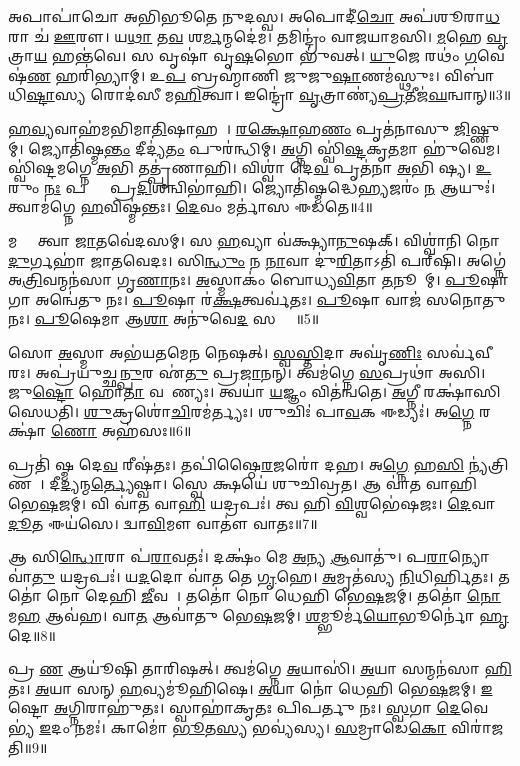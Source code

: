 𑌅𑌪𑌾𑌪𑌾॑𑌚𑍋 𑌅𑌭𑌿𑌭𑍂𑌤𑍇 𑌨𑍁𑌦𑌸𑍍𑌵।
𑌅𑌪𑍋𑌦𑍀॑\ul{𑌚𑍋} 𑌅𑌪॑𑌶𑍂𑌰𑌾\ul{𑌧}𑌰𑌾 𑌚॑ \ul{𑌊}𑌰𑍗।
𑌯\ul{𑌥𑌾} 𑌤\ul{𑌵} 𑌶\ul{𑌰𑍍𑌮}𑌨𑍍𑌮𑌦𑍇॑𑌮।
𑌤𑌮𑌿𑌨𑍍𑌦𑍍𑌰𑌂॑ 𑌵𑌾𑌜𑌯𑌾𑌮𑌸𑌿।
\ul{𑌮}𑌹𑍇 \ul{𑌵𑍃}𑌤𑍍𑌰𑌾\ul{𑌯} 𑌹𑌨𑍍𑌤॑𑌵𑍇।
𑌸 𑌵𑍃𑌷𑌾॑ 𑌵𑍃\ul{𑌷}𑌭𑍋 𑌭𑍁॑𑌵𑌤𑍍।
\ul{𑌯𑍁}𑌜𑍇 𑌰𑌥𑌂॑ \ul{𑌗}𑌵𑍇𑌷॑\ul{𑌣}\ul{} 𑌹𑌰𑌿॑𑌭𑍍𑌯𑌾𑌮𑍍।
𑌉\ul{𑌪} 𑌬𑍍𑌰𑌹𑍍𑌮𑌾॑𑌣𑌿 𑌜𑍁𑌜𑍁\ul{𑌷𑌾}𑌣𑌮॑𑌸𑍍𑌥𑍁𑌃।
𑌵𑌿𑌬𑌾॑𑌧𑌿\ul{𑌷𑍍𑌟𑌾}𑌸𑍍𑌯 𑌰𑍋𑌦॑𑌸𑍀 𑌮\ul{𑌹𑌿}𑌤𑍍𑌵𑌾।
𑌇𑌨𑍍𑌦𑍍𑌰𑍋॑ \ul{𑌵𑍃}𑌤𑍍𑌰𑌾𑌣𑍍𑌯॑\ul{𑌪𑍍𑌰}𑌤𑍀𑌜॑\ul{𑌘}𑌨𑍍𑌵𑌾𑌨𑍍॥3॥

\ul{𑌹}\ul{𑌵𑍍𑌯}𑌵𑌾𑌹॑𑌮𑌭𑌿𑌮𑌾\ul{𑌤𑌿}𑌷𑌾𑌹𑌮𑍍᳚।
\ul{𑌰}\ul{𑌕𑍍𑌷𑍋}𑌹\ul{𑌣𑌂} 𑌪𑍃𑌤॑𑌨𑌾𑌸𑍁 \ul{𑌜𑌿}𑌷𑍍𑌣𑍁𑌮𑍍।
𑌜𑍍𑌯𑍋𑌤𑌿॑𑌷𑍍𑌮\ul{𑌨𑍍𑌤𑌂} 𑌦𑍀𑌦𑍍𑌯॑\ul{𑌤𑌂} 𑌪𑍁𑌰॑𑌨𑍍𑌧𑌿𑌮𑍍।
\ul{𑌅}𑌗𑍍𑌨𑌿 𑌸𑍍𑌵𑌿॑\ul{𑌷𑍍𑌟}𑌕𑍃\ul{𑌤}𑌮𑌾 𑌹𑍁॑𑌵𑍇𑌮।
𑌸𑍍𑌵𑌿॑𑌷𑍍𑌟𑌮𑌗𑍍𑌨𑍇 \ul{𑌅}𑌭𑌿 𑌤𑌤𑍍𑌪𑍃॑𑌣𑌾𑌹𑌿।
𑌵𑌿𑌶𑍍𑌵𑌾॑ 𑌦𑍇\ul{𑌵} 𑌪𑍃𑌤॑𑌨𑌾 \ul{𑌅}𑌭𑌿 𑌷𑍍𑌯।
\ul{𑌉}𑌰𑍁𑌂 \ul{𑌨𑌃} 𑌪𑌨𑍍𑌥𑌾𑌂᳚ 𑌪𑍍𑌰\ul{𑌦𑌿}𑌶𑌨𑍍𑌵𑌿𑌭𑌾॑𑌹𑌿।
𑌜𑍍𑌯𑍋𑌤𑌿॑𑌷𑍍𑌮𑌦𑍍𑌧𑍇\ul{𑌹𑍍𑌯}𑌜𑌰𑌂॑ \ul{𑌨} 𑌆𑌯𑍁𑌃॑।
𑌤𑍍𑌵𑌾𑌮॑𑌗𑍍𑌨𑍇 \ul{𑌹}𑌵𑌿𑌷𑍍𑌮॑𑌨𑍍𑌤𑌃।
\ul{𑌦𑍇}𑌵𑌂 𑌮𑌰𑍍𑌤𑌾॑𑌸 𑌈𑌡𑌤𑍇॥4॥

𑌮𑌨𑍍𑌯𑍇᳚ 𑌤𑍍𑌵𑌾 \ul{𑌜𑌾}𑌤𑌵𑍇॑𑌦𑌸𑌮𑍍।
𑌸 \ul{𑌹}𑌵𑍍𑌯𑌾 𑌵॑𑌕𑍍𑌷𑍍𑌯𑌾\ul{𑌨𑍁}𑌷𑌕𑍍।
𑌵𑌿𑌶𑍍𑌵𑌾॑𑌨𑌿 𑌨𑍋 \ul{𑌦𑍁}𑌰𑍍𑌗𑌹𑌾॑ 𑌜𑌾𑌤𑌵𑍇𑌦𑌃।
𑌸𑌿\ul{𑌨𑍍𑌧𑍁𑌂} 𑌨 \ul{𑌨𑌾}𑌵𑌾 𑌦𑍁॑\ul{𑌰𑌿}𑌤𑌾𑌽𑌤𑌿॑ 𑌪𑌰𑍍‌\mbox{}𑌷𑌿।
𑌅𑌗𑍍𑌨𑍇॑ 𑌅\ul{𑌤𑍍𑌰𑌿}𑌵𑌨𑍍𑌮𑌨॑𑌸𑌾 𑌗𑍃\ul{𑌣𑌾}𑌨𑌃।
\ul{𑌅}𑌸𑍍𑌮𑌾𑌕𑌂॑ 𑌬𑍋𑌧𑍍𑌯\ul{𑌵𑌿}𑌤𑌾 \ul{𑌤}𑌨𑍂𑌨𑌾᳚𑌮𑍍।
\ul{𑌪𑍂}𑌷𑌾 𑌗𑌾 𑌅𑌨𑍍𑌵𑍇॑𑌤𑍁 𑌨𑌃।
\ul{𑌪𑍂}𑌷𑌾 𑌰॑\ul{𑌕𑍍𑌷}𑌤𑍍𑌵𑌰𑍍𑌵॑𑌤𑌃।
\ul{𑌪𑍂}𑌷𑌾 𑌵𑌾𑌜॑ 𑌸𑌨𑍋𑌤𑍁 𑌨𑌃।
\ul{𑌪𑍂}𑌷𑍇𑌮𑌾 𑌆\ul{𑌶𑌾} 𑌅𑌨𑍁॑𑌵𑍇\ul{𑌦} 𑌸𑌰𑍍𑌵𑌾𑌃᳚॥5॥

𑌸𑍋 \ul{𑌅}𑌸𑍍𑌮𑌾 𑌅𑌭॑𑌯𑌤𑌮𑍇𑌨 𑌨𑍇𑌷𑌤𑍍।
\ul{𑌸𑍍𑌵}\ul{𑌸𑍍𑌤𑌿}𑌦𑌾 𑌅𑌘𑍃॑\ul{𑌣𑌿𑌃} 𑌸𑌰𑍍𑌵॑𑌵𑍀𑌰𑌃।
𑌅𑌪𑍍𑌰॑𑌯𑍁𑌚𑍍𑌛\ul{𑌨𑍍𑌪𑍁}𑌰 𑌏॑\ul{𑌤𑍁} 𑌪𑍍𑌰\ul{𑌜𑌾}𑌨𑌨𑍍।
𑌤𑍍𑌵𑌮॑𑌗𑍍𑌨𑍇 \ul{𑌸}𑌪𑍍𑌰𑌥𑌾॑ 𑌅𑌸𑌿।
𑌜𑍁\ul{𑌷𑍍𑌟𑍋} 𑌹𑍋\ul{𑌤𑌾} 𑌵𑌰𑍇᳚𑌣𑍍𑌯𑌃।
𑌤𑍍𑌵𑌯𑌾॑ \ul{𑌯}𑌜𑍍𑌞𑌂 𑌵𑌿𑌤॑𑌨𑍍𑌵𑌤𑍇।
\ul{𑌅}𑌗𑍍𑌨𑍀 𑌰𑌕𑍍𑌷𑌾॑𑌸𑌿 𑌸𑍇𑌧𑌤𑌿।
\ul{𑌶𑍁}𑌕𑍍𑌰𑌶𑍋॑\ul{𑌚𑌿}𑌰𑌮॑𑌰𑍍𑌤𑍍𑌯𑌃।
𑌶𑍁𑌚𑌿𑌃॑ 𑌪𑌾\ul{𑌵}𑌕 𑌈𑌡𑍍𑌯𑌃॑।
𑌅\ul{𑌗𑍍𑌨𑍇} 𑌰𑌕𑍍𑌷𑌾॑ \ul{𑌣𑍋} 𑌅𑌹॑𑌸𑌃॥6॥

𑌪𑍍𑌰𑌤𑌿॑ 𑌷𑍍𑌮 𑌦𑍇\ul{𑌵} 𑌰𑍀𑌷॑𑌤𑌃।
𑌤𑌪𑌿॑𑌷𑍍𑌠𑍈\ul{𑌰}𑌜𑌰𑍋॑ 𑌦𑌹।
𑌅\ul{𑌗𑍍𑌨𑍇} 𑌹\ul{𑌸𑌿} 𑌨𑍍𑌯॑𑌤𑍍𑌰𑌿𑌣𑌮𑍍᳚।
𑌦𑍀\ul{𑌦𑍍𑌯}𑌨𑍍𑌮\ul{𑌰𑍍𑌤𑍍𑌯𑍇}𑌷𑍍𑌵𑌾।
𑌸𑍍𑌵𑍇 𑌕𑍍𑌷𑌯𑍇॑ 𑌶𑍁𑌚𑌿𑌵𑍍𑌰𑌤।
𑌆 𑌵𑌾॑𑌤 𑌵𑌾𑌹𑌿 𑌭𑍇\ul{𑌷}𑌜𑌮𑍍।
𑌵𑌿 𑌵𑌾॑𑌤 𑌵𑌾\ul{𑌹𑌿} 𑌯𑌦𑍍𑌰𑌪𑌃॑।
𑌤𑍍𑌵 𑌹𑌿 \ul{𑌵𑌿}𑌶𑍍𑌵𑌭𑍇॑𑌷𑌜𑌃।
\ul{𑌦𑍇}𑌵𑌾𑌨𑌾𑌂᳚ \ul{𑌦𑍂}𑌤 𑌈𑌯॑𑌸𑍇।
𑌦𑍍𑌵𑌾\ul{𑌵𑌿}𑌮𑍗 𑌵𑌾𑌤𑍗॑ 𑌵𑌾𑌤𑌃॥7॥

𑌆 𑌸𑌿\ul{𑌨𑍍𑌧𑍋}𑌰𑌾 𑌪॑\ul{𑌰𑌾}𑌵𑌤𑌃॑।
𑌦𑌕𑍍𑌷𑌂॑ 𑌮𑍇 \ul{𑌅}𑌨𑍍𑌯 \ul{𑌆}𑌵𑌾𑌤𑍁॑।
𑌪\ul{𑌰𑌾}𑌨𑍍𑌯𑍋 𑌵𑌾॑\ul{𑌤𑍁} 𑌯𑌦𑍍𑌰𑌪𑌃॑।
𑌯\ul{𑌦}𑌦𑍋 𑌵𑌾॑𑌤 𑌤𑍇 \ul{𑌗𑍃}𑌹𑍇।
\ul{𑌅}𑌮𑍃𑌤॑𑌸𑍍𑌯 \ul{𑌨𑌿}𑌧𑌿𑌰𑍍\mbox{}\ul{𑌹𑌿}𑌤𑌃।
𑌤𑌤𑍋॑ 𑌨𑍋 𑌦𑍇𑌹𑌿 \ul{𑌜𑍀}𑌵𑌸𑍇᳚।
𑌤𑌤𑍋॑ 𑌨𑍋 𑌧𑍇𑌹𑌿 𑌭𑍇\ul{𑌷}𑌜𑌮𑍍।
𑌤𑌤𑍋॑ \ul{𑌨𑍋} 𑌮\ul{𑌹} 𑌆𑌵॑𑌹।
𑌵𑌾\ul{𑌤} 𑌆𑌵𑌾॑𑌤𑍁 𑌭𑍇\ul{𑌷}𑌜𑌮𑍍।
\ul{𑌶}𑌮𑍍𑌭𑍂𑌰𑍍𑌮॑\ul{𑌯𑍋}𑌭𑍂𑌰𑍍𑌨𑍋॑ \ul{𑌹𑍃}𑌦𑍇॥8॥

𑌪𑍍𑌰 \ul{𑌣} 𑌆𑌯𑍂॑𑌷𑌿 𑌤𑌾𑌰𑌿𑌷𑌤𑍍।
𑌤𑍍𑌵𑌮॑𑌗𑍍𑌨𑍇 \ul{𑌅}𑌯𑌾𑌸𑌿॑।
\ul{𑌅}𑌯𑌾 𑌸𑌨𑍍𑌮𑌨॑𑌸𑌾 \ul{𑌹𑌿}𑌤𑌃।
\ul{𑌅}𑌯𑌾 𑌸𑌨𑍍 \ul{𑌹}𑌵𑍍𑌯𑌮𑍂॑𑌹𑌿𑌷𑍇।
\ul{𑌅}𑌯𑌾 𑌨𑍋॑ 𑌧𑍇𑌹𑌿 𑌭𑍇\ul{𑌷}𑌜𑌮𑍍।
\ul{𑌇}𑌷𑍍𑌟𑍋 \ul{𑌅}𑌗𑍍𑌨𑌿𑌰𑌾𑌹𑍁॑𑌤𑌃।
𑌸𑍍𑌵𑌾𑌹𑌾॑𑌕𑍃𑌤𑌃 𑌪𑌿𑌪𑌰𑍍𑌤𑍁 𑌨𑌃।
\ul{𑌸𑍍𑌵}𑌗𑌾 \ul{𑌦𑍇}𑌵𑍇𑌭𑍍𑌯॑ \ul{𑌇}𑌦𑌂 𑌨𑌮𑌃॑।
𑌕𑌾𑌮𑍋॑ \ul{𑌭𑍂}𑌤\ul{𑌸𑍍𑌯} 𑌭𑌵𑍍𑌯॑𑌸𑍍𑌯।
\ul{𑌸}𑌮𑍍𑌰𑌾𑌡𑍇\ul{𑌕𑍋} 𑌵𑌿𑌰𑌾॑𑌜𑌤𑌿॥9॥

